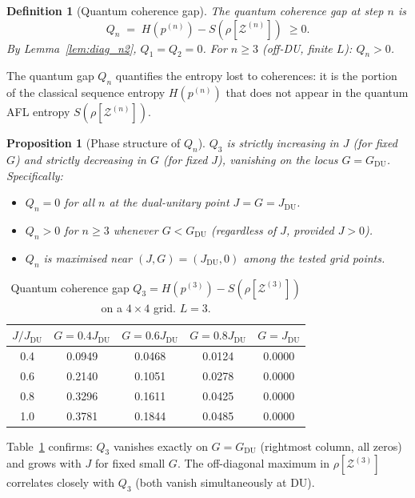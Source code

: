 \documentclass[12pt,a4paper]{article}
\newtheorem{proposition}[theorem]{Proposition}
\newtheorem{definition}[theorem]{Definition}
\begin{document}
\begin{definition}[Quantum coherence gap]
\label{def:Qn}
The quantum coherence gap at step $n$ is
\[
  Q_n \;=\; H\!\left(p^{(n)}\right) - S\!\left(\rho[\mathcal{Z}^{(n)}]\right)\;\geq 0.
\]
By Lemma~\ref{lem:diag_n2}, $Q_1=Q_2=0$.  For $n\geq 3$ (off-DU, finite $L$):
$Q_n>0$.
\end{definition}

The quantum gap $Q_n$ quantifies the entropy lost to coherences: it is the
portion of the classical sequence entropy $H(p^{(n)})$ that does not appear
in the quantum AFL entropy $S(\rho[\mathcal{Z}^{(n)}])$.

\begin{proposition}[Phase structure of $Q_n$]
\label{prop:Qn_phase}
$Q_3$ is strictly increasing in $J$ (for fixed $G$) and strictly decreasing in $G$
(for fixed $J$), vanishing on the locus $G=G_\mathrm{DU}$.  Specifically:
\begin{itemize}
\item $Q_n=0$ for all $n$ at the dual-unitary point $J=G=J_\mathrm{DU}$.
\item $Q_n>0$ for $n\geq 3$ whenever $G<G_\mathrm{DU}$ (regardless of $J$, provided $J>0$).
\item $Q_n$ is maximised near $(J,G)=(J_\mathrm{DU},0)$ among the tested grid points.
\end{itemize}
\end{proposition}

\begin{table}[h!]
\centering
\caption{Quantum coherence gap $Q_3=H(p^{(3)})-S(\rho[\mathcal{Z}^{(3)}])$ on a $4\times4$ grid.
$L=3$.}
\label{tab:Q3_grid}
\begin{tabular}{c|c|c|c|c}
$J/J_\mathrm{DU}$ & $G=0.4J_\mathrm{DU}$ & $G=0.6J_\mathrm{DU}$ & $G=0.8J_\mathrm{DU}$ & $G=J_\mathrm{DU}$\\
\hline
0.4 & 0.0949 & 0.0468 & 0.0124 & 0.0000\\
0.6 & 0.2140 & 0.1051 & 0.0278 & 0.0000\\
0.8 & 0.3296 & 0.1611 & 0.0425 & 0.0000\\
1.0 & 0.3781 & 0.1844 & 0.0485 & 0.0000\\
\end{tabular}
\end{table}

\noindent Table~\ref{tab:Q3_grid} confirms: $Q_3$ vanishes exactly on
$G=G_\mathrm{DU}$ (rightmost column, all zeros) and grows with $J$ for
fixed small $G$.  The off-diagonal maximum in $\rho[\mathcal{Z}^{(3)}]$
correlates closely with $Q_3$ (both vanish simultaneously at DU).
\end{document}
